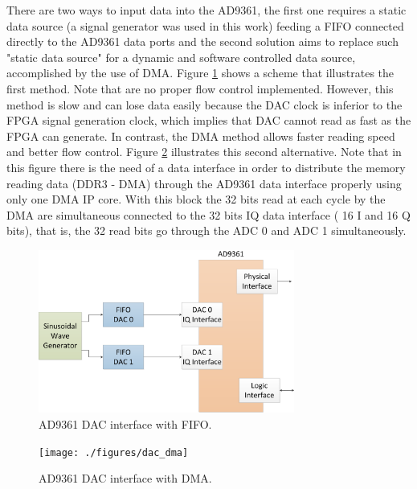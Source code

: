 There are two ways to input data into the AD9361, the first one requires a
static data source (a signal generator was used in this work) feeding a FIFO
connected directly to the AD9361 data ports and the second solution aims to
replace such "static data source" for a dynamic and software controlled data
source, accomplished by the use of DMA. Figure \ref{fig:ad9361txfifo} shows a
scheme that illustrates the first method. Note that are no proper flow control
implemented. However, this method is slow and can lose data easily because the
DAC clock is inferior to the FPGA signal generation clock, which implies that
DAC cannot read as fast as the FPGA can generate. In contrast, the DMA method
allows faster reading speed and better flow control. Figure
\ref{fig:ad9361txdma} illustrates this second alternative. Note that in this
figure there is the need of a data interface in order to distribute the memory
reading data (DDR3 - DMA) through the AD9361 data interface properly using only
one DMA IP core. With this block the 32 bits read at each cycle by the DMA are
simultaneous connected to the 32 bits IQ data interface ( 16 I and 16 Q bits),
that is, the 32 read bits go through the ADC 0 and ADC 1 simultaneously.


\begin{figure}[htbp]
    \centering
    \includegraphics[width=0.75\textwidth]{./figures/dac_fifo}
    \caption{ AD9361 DAC interface with FIFO.
    \label{fig:ad9361txfifo}}
\end{figure}


\begin{figure}[htbp]
    \centering
    \texttt{[image: ./figures/dac\_dma]}
    \caption{ AD9361 DAC interface with DMA.
    \label{fig:ad9361txdma}}
\end{figure}

